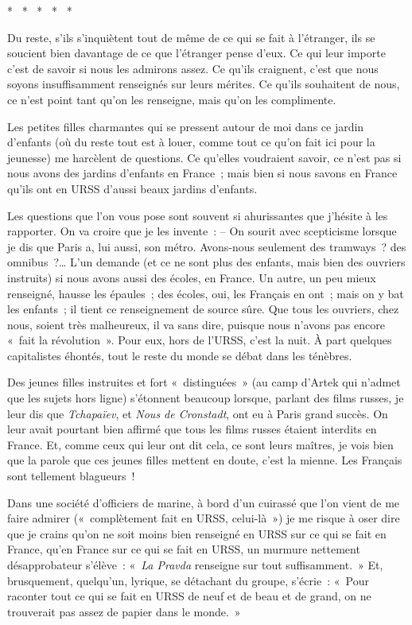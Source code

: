 \documentclass[french,twoside]{book} %
\begin{document}
\begin{center}
\noindent \centerline{*  *  *  *  *}\par
\end{center}

\noindent Du reste, s’ils s’inquiètent tout de même de ce qui se fait à l’étranger, ils se soucient bien davantage de ce que l’étranger pense d’eux. Ce qui leur importe c’est de savoir si nous les admirons assez. Ce qu’ils craignent, c’est que nous soyons insuffisamment renseignés sur leurs mérites. Ce qu’ils souhaitent de nous, ce n’est point tant qu’on les renseigne, mais qu’on les complimente.\par
Les petites filles charmantes qui se pressent autour de moi dans ce jardin d’enfants (où du reste tout est à louer, comme tout ce qu’on fait ici pour la jeunesse) me harcèlent de questions. Ce qu’elles voudraient savoir, ce n’est pas si nous avons des jardins d’enfants en France ; mais bien si nous savons en France qu’ils ont en URSS d’aussi beaux jardins d’enfants.\par
Les questions que l’on vous pose sont souvent si ahurissantes que j’hésite à les rapporter. On va croire que je les invente : – On sourit avec scepticisme lorsque je dis que Paris a, lui aussi, son métro. Avons-nous seulement des tramways ? des omnibus ?… L’un demande (et ce ne sont plus des enfants, mais bien des ouvriers instruits) si nous avons aussi des écoles, en France. Un autre, un peu mieux renseigné, hausse les épaules ; des écoles, oui, les Français en ont ; mais on y bat les enfants ; il tient ce renseignement de source sûre. Que tous les ouvriers, chez nous, soient très malheureux, il va sans dire, puisque nous n’avons pas encore « fait la révolution ». Pour eux, hors de l’URSS, c’est la nuit. À part quelques capitalistes éhontés, tout le reste du monde se débat dans les ténèbres.\par
Des jeunes filles instruites et fort « distinguées » (au camp d’Artek qui n’admet que les sujets hors ligne) s’étonnent beaucoup lorsque, parlant des films russes, je leur dis que \emph{Tchapaïev}, et \emph{Nous de Cronstadt}, ont eu à Paris grand succès. On leur avait pourtant bien affirmé que tous les films russes étaient interdits en France. Et, comme ceux qui leur ont dit cela, ce sont leurs maîtres, je vois bien que la parole que ces jeunes filles mettent en doute, c’est la mienne. Les Français sont tellement blagueurs !\par
Dans une société d’officiers de marine, à bord d’un cuirassé que l’on vient de me faire admirer (« complètement fait en URSS, celui-là ») je me risque à oser dire que je crains qu’on ne soit moins bien renseigné en URSS sur ce qui se fait en France, qu’en France sur ce qui se fait en URSS, un murmure nettement désapprobateur s’élève : « \emph{La Pravda} renseigne sur tout suffisamment. » Et, brusquement, quelqu’un, lyrique, se détachant du groupe, s’écrie : « Pour raconter tout ce qui se fait en URSS de neuf et de beau et de grand, on ne trouverait pas assez de papier dans le monde. »\par
\end{document}
